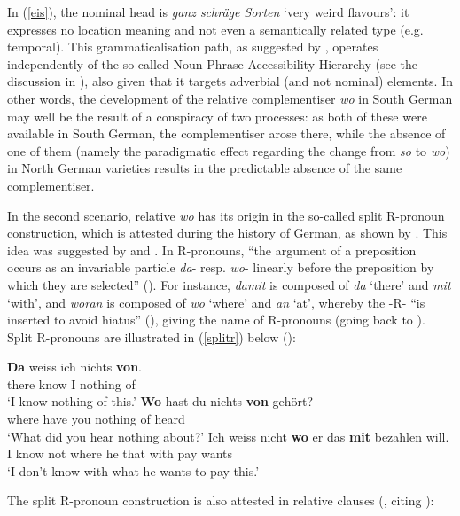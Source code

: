 {In (\ref{eis}), the nominal head is \textit{ganz schräge Sorten} `very weird flavours': it expresses no location meaning and not even a semantically related type (e.g. temporal). This grammaticalisation path, as suggested by \citet{ballareinglese2022}, operates independently of the so-called Noun Phrase Accessibility Hierarchy (see the discussion in ), also given that it targets adverbial (and not nominal) elements. In other words, the development of the relative complementiser \textit{wo} in South German may well be the result of a conspiracy of two processes: as both of these were available in South German, the complementiser arose there, while the absence of one of them (namely the paradigmatic effect regarding the change from \textit{so} to \textit{wo}) in North German varieties results in the predictable absence of the same complementiser.}

In the second scenario, relative \textit{wo} has its origin in the so-called split R-pro\-noun construction, which is attested during the history of German, as shown by \citet{fleischer2008}. This idea was suggested by \citet{staedele1927} and \citet{paul1920band3}. In R-pronouns, ``the argument of a preposition occurs as an invariable particle \textit{da}- resp. \textit{wo}- linearly before the preposition by which they are selected'' (\citealt[141]{brandnerbraeuning2013}). For instance, \textit{damit} is composed of \textit{da} `there' and \textit{mit} `with', and \textit{woran} is composed of \textit{wo} `where' and \textit{an} `at', whereby the -R- ``is inserted to avoid hiatus'' (\citealt[141]{brandnerbraeuning2013}), giving the name of R-pronouns (going back to \citealt{vanriemsdijk1978}). Split R-pronouns are illustrated in (\ref{splitr}) below (\citealt[141, ex. 25]{brandnerbraeuning2013}):

\ea \label{splitr}
\ea \gll \textbf{Da} weiss ich nichts \textbf{von}.\\
there know I nothing of\\
\glt `I know nothing of this.'
\ex \gll \textbf{Wo} hast du nichts \textbf{von} gehört?\\
where have you nothing of heard\\
\glt `What did you hear nothing about?'
\ex \gll Ich weiss nicht \textbf{wo} er das \textbf{mit} bezahlen will.\\
I know not where he that with pay wants\\
\glt `I don't know with what he wants to pay this.'
\z
\z

The split R-pronoun construction is also attested in relative clauses (\citealt[142, ex. 26]{brandnerbraeuning2013}, citing \citealt{staedele1927}):

